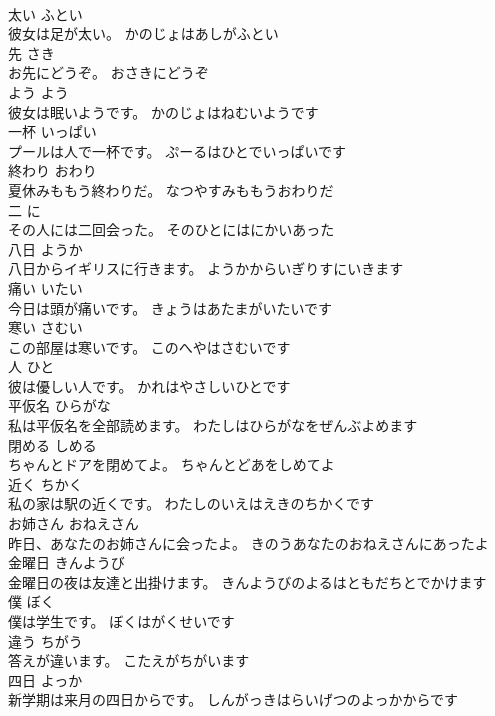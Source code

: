 \documentclass[8pt]{extreport}
\begin{document}
\begin{CJK}{UTF8}{min}
\\	太い	ふとい	
\\	彼女は足が太い。	かのじょはあしがふとい	
\\	先	さき	
\\	お先にどうぞ。	おさきにどうぞ	
\\	よう	よう	
\\	彼女は眠いようです。	かのじょはねむいようです	
\\	一杯	いっぱい	
\\	プールは人で一杯です。	ぷーるはひとでいっぱいです	
\\	終わり	おわり	
\\	夏休みももう終わりだ。	なつやすみももうおわりだ	
\\	二	に	
\\	その人には二回会った。	そのひとにはにかいあった	
\\	八日	ようか	
\\	八日からイギリスに行きます。	ようかからいぎりすにいきます	
\\	痛い	いたい	
\\	今日は頭が痛いです。	きょうはあたまがいたいです	
\\	寒い	さむい	
\\	この部屋は寒いです。	このへやはさむいです	
\\	人	ひと	
\\	彼は優しい人です。	かれはやさしいひとです	
\\	平仮名	ひらがな	
\\	私は平仮名を全部読めます。	わたしはひらがなをぜんぶよめます	
\\	閉める	しめる	
\\	ちゃんとドアを閉めてよ。	ちゃんとどあをしめてよ	
\\	近く	ちかく	
\\	私の家は駅の近くです。	わたしのいえはえきのちかくです	
\\	お姉さん	おねえさん	
\\	昨日、あなたのお姉さんに会ったよ。	きのうあなたのおねえさんにあったよ	
\\	金曜日	きんようび	
\\	金曜日の夜は友達と出掛けます。	きんようびのよるはともだちとでかけます	
\\	僕	ぼく	
\\	僕は学生です。	ぼくはがくせいです	
\\	違う	ちがう	
\\	答えが違います。	こたえがちがいます	
\\	四日	よっか	
\\	新学期は来月の四日からです。	しんがっきはらいげつのよっかからです	

\end{CJK}
\end{document}
